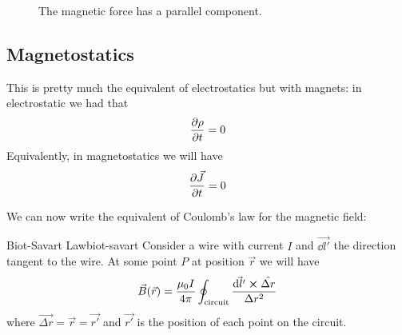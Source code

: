 \documentclass[12pt]{extarticle}
\begin{document}
\begin{figure}[H]
    \centering
    \caption{The magnetic force has a parallel component.}
    \label{fig:mag-field-parallel}
\end{figure}

\subsection{Magnetostatics}

This is pretty much the equivalent of electrostatics but with magnets:
in electrostatic we had that
\begin{equation}
    \pdv{\rho}{t} = 0
\end{equation}
Equivalently, in magnetostatics we will have
\begin{equation}
    \pdv{\vec J}{t} = 0
\end{equation}

We can now write the equivalent of Coulomb's law for the magnetic field:
\begin{theorem}{Biot-Savart Law}{biot-savart}
    Consider a wire with current $I$ and $\vec{\dd l'}$ the direction tangent to the wire.
    At some point $P$ at position $\vec r$ we will have
    \begin{equation}
        \vec B(\vec r) = \frac{\mu_0 I}{4 \pi} \oint_\text{circuit} \frac{\vec{\dd l'} \cross \hat{\Delta r}}{\Delta r^2}
    \end{equation}
    where $\vec{\Delta r} = \vec r = \vec{r '}$ and $\vec{r'}$ is the position of each point on the circuit.
\end{theorem}
\end{document}
